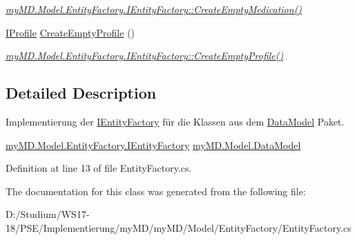 \begin{CompactItemize}
\begin{CompactList}\small\item\em \hyperlink{interfacemy_m_d_1_1_model_1_1_entity_factory_1_1_i_entity_factory_3fd69c99a27372f99eae3cda6e23e2e6}{my\-MD.Model.Entity\-Factory.IEntity\-Factory::Create\-Empty\-Medication()} \item\end{CompactList}\item 
\hypertarget{classmy_m_d_1_1_model_1_1_entity_factory_1_1_entity_factory_d81849285c0ecfe46b822095df995e8e}{
\hyperlink{interfacemy_m_d_1_1_model_interface_1_1_data_model_interface_1_1_i_profile}{IProfile} \hyperlink{classmy_m_d_1_1_model_1_1_entity_factory_1_1_entity_factory_d81849285c0ecfe46b822095df995e8e}{Create\-Empty\-Profile} ()}
\label{dd/d55/classmy_m_d_1_1_model_1_1_entity_factory_1_1_entity_factory_d81849285c0ecfe46b822095df995e8e}

\begin{CompactList}\small\item\em \hyperlink{interfacemy_m_d_1_1_model_1_1_entity_factory_1_1_i_entity_factory_d81849285c0ecfe46b822095df995e8e}{my\-MD.Model.Entity\-Factory.IEntity\-Factory::Create\-Empty\-Profile()} \item\end{CompactList}\end{CompactItemize}


\subsection{Detailed Description}
Implementierung der \hyperlink{interfacemy_m_d_1_1_model_1_1_entity_factory_1_1_i_entity_factory}{IEntity\-Factory} f\"{u}r die Klassen aus dem \hyperlink{namespacemy_m_d_1_1_model_1_1_data_model}{Data\-Model} Paket. 

\hyperlink{interfacemy_m_d_1_1_model_1_1_entity_factory_1_1_i_entity_factory}{my\-MD.Model.Entity\-Factory.IEntity\-Factory} \hyperlink{namespacemy_m_d_1_1_model_1_1_data_model}{my\-MD.Model.Data\-Model}



Definition at line 13 of file Entity\-Factory.cs.

The documentation for this class was generated from the following file:\begin{CompactItemize}
\item 
D:/Studium/WS17-18/PSE/Implementierung/my\-MD/my\-MD/Model/Entity\-Factory/Entity\-Factory.cs\end{CompactItemize}
